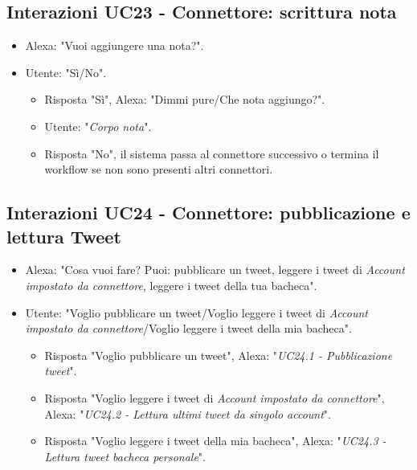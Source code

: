 \subsection{Interazioni UC23 - Connettore: scrittura nota}
\label{sec:connettore_nota}
\begin{itemize}
        \item Alexa: "Vuoi aggiungere una nota?".
        \item Utente: "Sì/No".
        \begin{itemize}
         \item{Risposta "Sì"}, Alexa: "Dimmi pure/Che nota aggiungo?".
         \item Utente: "{\it Corpo nota}".
         \item{Risposta "No"}, il sistema passa al connettore successivo o termina il workflow se non sono presenti altri connettori.
         \end{itemize}
    \end{itemize}


\subsection{Interazioni UC24 - Connettore: pubblicazione e lettura Tweet}
\label{sec:connettore_twitter}
 \begin{itemize}
        \item Alexa: "Cosa vuoi fare? Puoi: pubblicare un tweet, leggere i tweet di {\it Account impostato da connettore}, leggere i tweet della tua bacheca".
        \item Utente: "Voglio pubblicare un tweet/Voglio leggere i tweet di {\it Account impostato da connettore}/Voglio leggere i tweet della mia bacheca".
        \begin{itemize}
         \item{Risposta "Voglio pubblicare un tweet"}, Alexa: "{\it UC24.1 - Pubblicazione tweet}".
         \item{Risposta "Voglio leggere i tweet di {\it Account impostato da connettore}"}, Alexa: "{\it UC24.2 - Lettura ultimi tweet da singolo account}".
         \item{Risposta "Voglio leggere i tweet della mia bacheca"}, Alexa: "{\it UC24.3 - Lettura tweet bacheca personale}".
         \end{itemize}
    \end{itemize}


